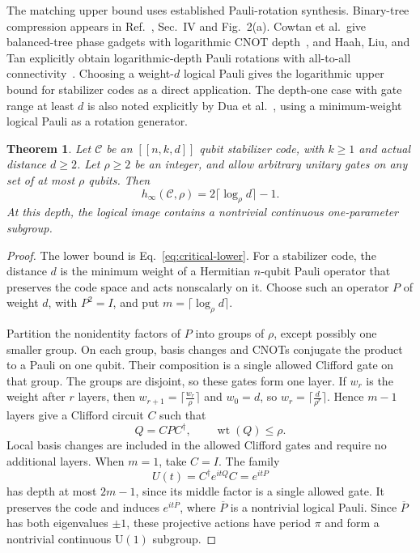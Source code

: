 \documentclass[aps,prl,reprint,notitlepage,nofootinbib,nobibnotes]{revtex4-2}
\newtheorem{theorem}{Theorem}
\newcommand{\id}{I}
\begin{document}
The matching upper bound uses established Pauli-rotation synthesis.
Binary-tree compression appears in Ref.~\cite{BonetMonroig}, Sec.~IV and
Fig.~2(a). Cowtan et al.\ give balanced-tree phase gadgets with logarithmic
CNOT depth~\cite[Cor.~3.4 and the following discussion]{Cowtan}, and
Haah, Liu, and Tan explicitly obtain logarithmic-depth Pauli rotations
with all-to-all connectivity~\cite[Cor.~3.6]{HaahLiuTan}.
Choosing a weight-\(d\) logical Pauli gives the logarithmic upper bound
for stabilizer codes as a direct application. The depth-one
case with gate range at least \(d\) is also noted explicitly by
Dua et al.~\cite[Sec.~I]{Dua}, using a minimum-weight logical Pauli as
a rotation generator.

\begin{samepage}
\begin{theorem}\label{cor:critical}
Let \(\mathcal C\) be an \([[n,k,d]]\) qubit stabilizer code,
with \(k\ge1\) and actual distance \(d\ge2\). Let \(\rho\ge2\) be an
integer, and allow arbitrary unitary gates on any set of at most \(\rho\)
qubits. Then
\begin{equation}\label{eq:critical}
 h_\infty(\mathcal C,\rho)=2\lceil\log_{\rho} d\rceil-1.
\end{equation}
At this depth, the logical image contains a nontrivial continuous
one-parameter subgroup.
\end{theorem}
\end{samepage}

\begin{proof}
The lower bound is Eq.~\eqref{eq:critical-lower}. For a stabilizer code, the distance \(d\) is the minimum weight of a Hermitian
\(n\)-qubit Pauli operator that preserves the code space and acts
nonscalarly on it. Choose such an operator \(P\) of weight \(d\), with
\(P^2=\id\), and put \(m=\lceil\log_{\rho} d\rceil\).

Partition the nonidentity factors of \(P\) into groups of \(\rho\),
except possibly one smaller group.
On each group, basis changes and CNOTs conjugate the product to a Pauli
on one qubit. Their composition is a single allowed Clifford gate on
that group. The groups are disjoint, so these gates form one layer.
If \(w_r\) is the weight after \(r\) layers, then
\(w_{r+1}=\lceil \frac{w_r}{\rho}\rceil\) and \(w_0=d\), so
\(w_r=\lceil \frac{d}{\rho^r}\rceil\). Hence \(m-1\) layers give a Clifford circuit
\(C\) such that
\[
 Q=CPC^\dagger,\qquad \operatorname{wt}(Q)\le \rho.
\]
Local basis changes are included in the allowed Clifford gates and
require no additional layers. When \(m=1\), take \(C=\id\).
The family
\begin{equation}\label{eq:pauli-family}
 U(t)=C^\dagger e^{itQ}C=e^{itP}
\end{equation}
has depth at most \(2m-1\), since its middle factor is a single allowed
gate. It preserves the code and induces \(e^{it\overline P}\), where
\(\overline P\) is a nontrivial logical Pauli. Since \(\overline P\) has both eigenvalues \(\pm1\), these projective
actions have period \(\pi\) and form a nontrivial continuous
\(\mathrm U(1)\) subgroup.
\end{proof}
\end{document}
